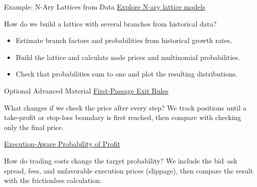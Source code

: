 \documentclass[aspectratio=169,11pt]{beamer}
\begin{document}
\begin{frame}{Example: N-Ary Lattices from Data}
\textbf{}
  \href{https://github.com/varnerlab/CHEME-5660-CourseRepository-Fall-2026/blob/main/lectures/week-4/L4a/CHEME-5660-L4a-Example-N-Ary-Lattice-Fall-2026.ipynb}{Explore N-ary lattice models}

  \vspace{0.7em}
  How do we build a lattice with several branches from historical data?

  \vspace{0.5em}
  \begin{itemize}\setlength{\itemsep}{0.6em}
    \item Estimate branch factors and probabilities from historical growth rates.
    \item Build the lattice and calculate node prices and multinomial probabilities.
    \item Check that probabilities sum to one and plot the resulting distributions.
  \end{itemize}

\end{frame}

\begin{frame}{Optional Advanced Material}
\textbf{}
  \href{https://github.com/varnerlab/CHEME-5660-CourseRepository-Fall-2026/blob/main/lectures/week-4/L4a/advanced/first-passage/CHEME-5660-L4a-Advanced-FirstPassage-ExitRules-Fall-2026.ipynb}{First-Passage Exit Rules}

  What changes if we check the price after every step? We track positions until
  a take-profit or stop-loss boundary is first reached, then compare with
  checking only the final price.

  \vspace{1.0em}
  \textbf{}
  \href{https://github.com/varnerlab/CHEME-5660-CourseRepository-Fall-2026/blob/main/lectures/week-4/L4a/advanced/execution/CHEME-5660-L4a-Advanced-ExecutionAware-ProbabilityOfProfit-Fall-2026.ipynb}{Execution-Aware Probability of Profit}

  How do trading costs change the target probability? We include the bid--ask
  spread, fees, and unfavorable execution prices (slippage), then compare
  the result with the frictionless calculation.

  \vspace{0.8em}
\end{frame}
\end{document}
